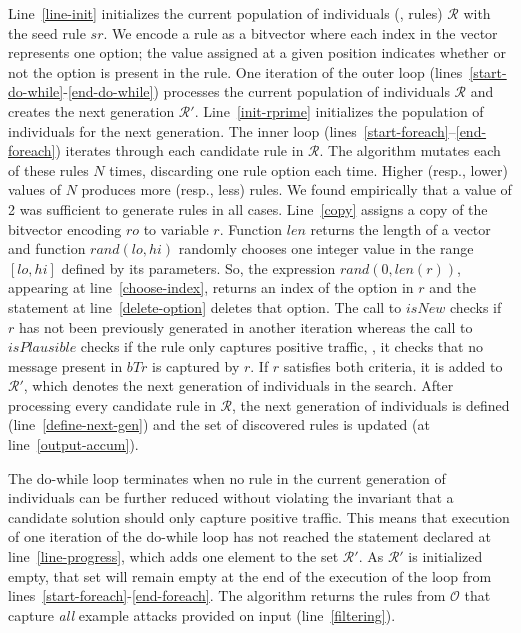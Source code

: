 \documentclass[conference]{IEEEtran}
\begin{document}
Line~\ref{line-init} initializes the current population of individuals
(\ie{}, rules) $\mathcal{R}$ with the seed rule $sr$. We encode a rule
as a bitvector where each index in the vector represents one option;
the value assigned at a given position indicates whether or not the
option is present in the rule. One iteration of the outer loop
(lines~\ref{start-do-while}-\ref{end-do-while}) processes the current
population of individuals $\mathcal R$ and creates the next generation
$\mathcal R'$. Line~\ref{init-rprime} initializes the population of
individuals for the next generation. The inner loop
(lines~\ref{start-foreach}--\ref{end-foreach}) iterates through each
candidate rule in $\mathcal R$. The algorithm mutates each of these
rules $N$ times, discarding one rule option each
time. Higher (resp., lower) values of $N$ produces more (resp.,
less) rules. We found empirically that a value of 2 was sufficient to
generate rules in all cases. Line~\ref{copy} assigns a copy of the bitvector encoding
$\mathit{ro}$ to variable $r$. Function $\mathit{len}$ returns the
length of a vector and function $\mathit{rand(lo, hi)}$ randomly
chooses one integer value in the range $[lo, hi]$ defined by its
parameters. So, the expression $\mathit{rand(0, len(r))}$, appearing
at line~\ref{choose-index}, returns an index of the option in $r$ and
the statement at line~\ref{delete-option} deletes that option. The
call to $\mathit{isNew}$ checks if $r$ has not been previously
generated in another iteration whereas the call to
$\mathit{isPlausible}$ checks if the rule only captures positive
traffic, \ie{}, it checks that no message present in $\mathit{bTr}$ is
captured by $r$. If $r$ satisfies both criteria, it is added to
$\mathcal R'$, which denotes the next generation of individuals in the
search. After processing every candidate rule in $\mathcal R$, the
next generation of individuals is defined (line~\ref{define-next-gen})
and the set of discovered rules is updated (at
line~\ref{output-accum}).


The do-while loop terminates when no rule in the current generation of
individuals can be further reduced without violating the invariant
that a candidate solution should only capture positive traffic. This
means that execution of one iteration of the do-while loop has not
reached the statement declared at line~\ref{line-progress}, which adds
one element to the set $\mathcal{R'}$. As $\mathcal{R'}$ is
initialized empty, that set will remain empty at the end of the
execution of the loop from
lines~\ref{start-foreach}-\ref{end-foreach}. The algorithm returns the
rules from $\mathcal O$ that capture \emph{all} example attacks
provided on input (line~\ref{filtering}).
\end{document}
